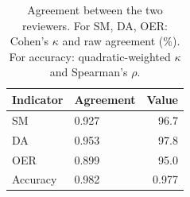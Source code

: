 \begin{table}[H]
\caption{Agreement between the two reviewers. For SM, DA, OER: Cohen's $\kappa$ and raw agreement (\%). For accuracy: quadratic-weighted $\kappa$ and Spearman's $\rho$.}
\label{tab:reviewer:agreement}
\centering
\begin{tabular}{llr}
\toprule
Indicator & Agreement & Value \\
\midrule
SM & 0.927 & 96.7 \\
DA & 0.953 & 97.8 \\
OER & 0.899 & 95.0 \\
Accuracy & 0.982 & 0.977 \\
\bottomrule
\end{tabular}
\end{table}
